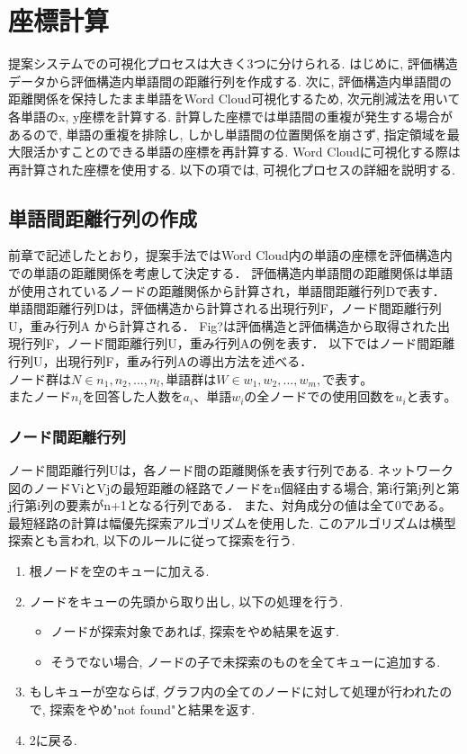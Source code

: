 \documentclass[syuuron]{kuee}
\begin{document}
	\section{座標計算}
		提案システムでの可視化プロセスは大きく3つに分けられる. 
		はじめに, 評価構造データから評価構造内単語間の距離行列を作成する. 
		次に, 評価構造内単語間の距離関係を保持したまま単語をWord Cloud可視化するため, 次元削減法を用いて各単語のx, y座標を計算する. 
		計算した座標では単語間の重複が発生する場合があるので, 
		単語の重複を排除し, しかし単語間の位置関係を崩さず, 指定領域を最大限活かすことのできる単語の座標を再計算する. 
		Word Cloudに可視化する際は再計算された座標を使用する. 
		以下の項では, 可視化プロセスの詳細を説明する. 
		
		\subsection{単語間距離行列の作成}
			前章で記述したとおり，提案手法ではWord Cloud内の単語の座標を評価構造内での単語の距離関係を考慮して決定する．
			評価構造内単語間の距離関係は単語が使用されているノードの距離関係から計算され，単語間距離行列Dで表す．
			単語間距離行列Dは，評価構造から計算される出現行列F，ノード間距離行列U，重み行列A から計算される．
			Fig?は評価構造と評価構造から取得された出現行列F，ノード間距離行列U，重み行列Aの例を表す．
			以下ではノード間距離行列U，出現行列F，重み行列Aの導出方法を述べる．
			$ノード群はN \in {n_{1}, n_{2}, ..., n_{l}}, 単語群はW \in {w_{1}, w_{2}, ..., w_{m}}, で表す。$
			$またノードn_iを回答した人数をa_i、単語w_iの全ノードでの使用回数をu_iと表す。$
			
			\subsubsection{ノード間距離行列}
				ノード間距離行列Uは，各ノード間の距離関係を表す行列である. 
				ネットワーク図のノードViとVjの最短距離の経路でノードをn個経由する場合, 
				第i行第j列と第j行第i列の要素がn+1となる行列である．
				また、対角成分の値は全て0である。
				最短経路の計算は幅優先探索アルゴリズムを使用した. 
				このアルゴリズムは横型探索とも言われ, 以下のルールに従って探索を行う. 
				
				\begin{enumerate}
					\item 根ノードを空のキューに加える. 
					\item ノードをキューの先頭から取り出し, 以下の処理を行う. 
						\begin{itemize}
							\item ノードが探索対象であれば, 探索をやめ結果を返す. 
							\item そうでない場合, ノードの子で未探索のものを全てキューに追加する. 
						\end{itemize}
					\item もしキューが空ならば, グラフ内の全てのノードに対して処理が行われたので, 探索をやめ"not found"と結果を返す. 
					\item 2に戻る. 
				\end{enumerate}
				
\end{document}
